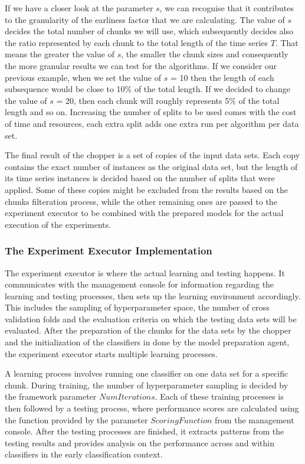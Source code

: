 If we have a closer look at the parameter $s$, we can recognise that it contributes to the granularity of the earliness factor that we are calculating.
The value of $s$ decides the total number of chunks we will use, which subsequently decides also the ratio represented by each chunk to the total length of the time series $T$.
That means the greater the value of $s$, the smaller the chunk sizes and consequently the more granular results we can test for the algorithms.
If we consider our previous example, when we set the value of $s$ = 10 then the length of each subsequence would be close to 10\% of the total length.
If we decided to change the value of $s$ = 20, then each chunk will roughly represents 5\% of the total length and so on.
Increasing the number of splits to be used comes with the cost of time and resources, each extra split adds one extra run per algorithm per data set.

The final result of the chopper is a set of copies of the input data sets. Each copy contains the exact number of instances as the original data set,
but the length of its time series instances is decided based on the number of splits that were applied.
Some of these copies might be excluded from the results based on the chunks filteration process, while the other remaining ones are passed to the experiment executor
to be combined with the prepared models for the actual execution of the experiments.

\subsubsection*{The Experiment Executor Implementation}
\label{ExperimentExecutorImplementation}
The experiment executor is where the actual learning and testing happens.
It communicates with the management console for information regarding the learning and testing processes, then sets up the learning environment accordingly.
This includes the sampling of hyperparameter space, the number of cross validation folds and the evaluation criteria on which the testing data sets will be evaluated.
After the preparation of the chunks for the data sets by the chopper and the initialization of the classifiers in done by the model preparation agent, the experiment executor starts multiple learning processes.

A learning process involves running one classifier on one data set for a specific chunk.
During training, the number of hyperparameter sampling is decided by the framework parameter $NumIterations$.
Each of these training processes is then followed by a testing process, where performance scores are calculated using the function provided by the parameter $ScoringFunction$ from the management console.
After the testing processes are finished, it extracts patterns from the testing results and provides analysis on the performance across and within classifiers in the early classification context.

